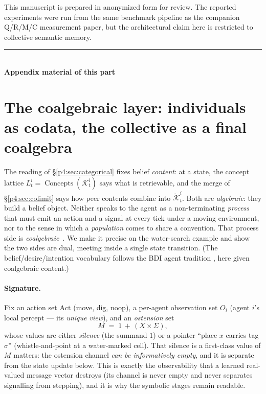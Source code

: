 \documentclass{article}
\begin{document}
\begin{ack}
This manuscript is prepared in anonymized form for review. The
reported experiments were run from the same benchmark pipeline as the
companion Q/R/M/C measurement paper, but the architectural claim here
is restricted to collective semantic memory.
\end{ack}

{\small

}

\FloatBarrier
\begin{center}\rule{0.55\linewidth}{0.4pt}\\[2pt]\textbf{Appendix material of this part}\end{center}


\section{The coalgebraic layer: individuals as codata, the collective as a final coalgebra}
\label{p4:sec:coalgebra}

The reading of \S\ref{p4:sec:categorical} fixes belief \emph{content}: at a
state, the concept lattice $L_t^i=\operatorname{Concepts}(\mathcal{K}_t^i)$
says what is retrievable, and the merge of \S\ref{p4:sec:colimit} says how peer
contents combine into $\widetilde{\mathcal K}_t^i$. Both are
\emph{algebraic}: they build a belief object. Neither speaks to the agent as
a non-terminating \emph{process} that must emit an action and a signal at
every tick under a moving environment, nor to the sense in which a
\emph{population} comes to share a convention. That process side is
\emph{coalgebraic}~\citep{rutten2000universal,jacobs2016coalgebra}. We make it precise on the water-search example and show
the two sides are dual, meeting inside a single state transition. (The
belief/desire/intention vocabulary follows the BDI agent tradition
\citep{rao1995bdi}, here given coalgebraic content.)

\paragraph{Signature.} Fix an action set $\mathrm{Act}$ (move, dig, noop), a
per-agent observation set $O_i$ (agent $i$'s local percept --- its
\emph{unique view}), and an \emph{ostension} set
\[
  M \;=\; 1 \,+\, (X\times\Sigma),
\]
whose values are either \emph{silence} (the summand $1$) or a pointer
``place $x$ carries tag $\sigma$'' (whistle-and-point at a water-marked
cell). That silence is a first-class value of $M$ matters: the ostension
channel \emph{can be informatively empty}, and it is separate from the state
update below. This is exactly the observability that a learned real-valued
message vector destroys (its channel is never empty and never separates
signalling from stepping), and it is why the symbolic stages remain
readable.
\end{document}
